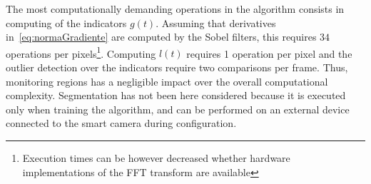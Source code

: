 \documentclass{llncs}
\begin{document}
The most computationally demanding operations in the algorithm consists in computing of the indicators $g(t)$. Assuming that derivatives in~\eqref{eq:normaGradiente} are computed by the Sobel filters, this requires $34$ operations per pixels\footnote{Execution times can be however  decreased whether hardware implementations of the FFT transform are available}. Computing $l(t)$ requires 1 operation per pixel and the outlier detection over the indicators require two comparisons per frame. Thus, monitoring regions has a negligible impact over the overall computational complexity. 
Segmentation has not been here considered because it is executed only when training the algorithm, and can be performed on an external device connected to the smart camera during configuration.

	

\end{document}
